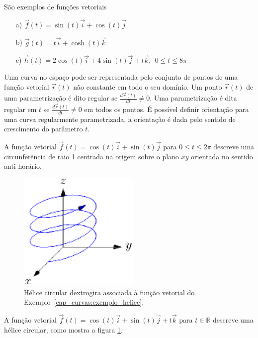 \begin{ex}\label{exfv01} São exemplos de funções vetoriais
\begin{itemize}
\item [a)] $\vec{f}(t)=\sin(t)\vec{i}+\cos(t)\vec{j}$
\item [b)] $\vec{g}(t)=t \vec{i}+\cosh(t)\vec{k}$
\item [c)] $\vec{h}(t)=2\cos(t)\vec{i}+4\sin(t)\vec{j}+t\vec{k},~~ 0\leq t \leq 8\pi$
\end{itemize}
\end{ex}  

Uma curva no espaço pode ser representada pelo conjunto de pontos de uma função vetorial $\vec{r}(t)$ não constante em todo o seu domínio. Um ponto $\vec{r}(t)$ de uma parametrização é dito regular se $\frac{d\vec{r}(t)}{dt} \neq 0$. Uma parametrização é dita regular em $t$ se $\frac{d\vec{r}(t)}{dt} \neq 0$ em todos os pontos. É possível definir orientação para uma curva regularmente parametrizada, a orientação é dada pelo sentido de crescimento do parâmetro $t$. 

\begin{ex}
A função vetorial $\vec{f}(t)=\cos(t)\vec{i}+\sin(t)\vec{j}$ para $0\leq t \leq 2\pi$ descreve  uma circunferência de raio 1 centrada na origem sobre o plano $xy$ orientada no sentido anti-horário.
\end{ex}

\begin{figure}%
\begin{center}
    \includegraphics{./cap_curvas/figs/helice}
\caption{\label{helicedex}Hélice circular dextrogira associada à função vetorial do Exemplo~\ref{cap_curvas:exemplo_helice}.}
  \end{center}
\end{figure}

\begin{ex}\label{cap_curvas:exemplo_helice}
A função vetorial $\vec{f}(t)=\cos(t)\vec{i}+\sin(t)\vec{j}+t\vec{k}$ para $ t \in\mathbb{R}$ descreve uma hélice circular, como mostra a figura \ref{helicedex}.
\end{ex}


